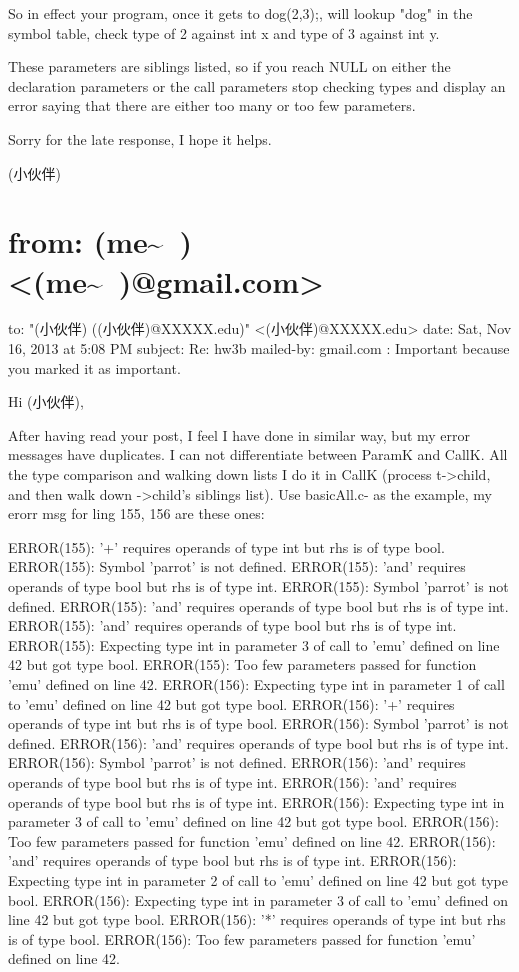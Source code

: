\documentclass[12pt]{book}
\begin{document}
So in effect your program, once it gets to dog(2,3);, will lookup "dog" in the symbol table, check type of 2 against int x and type of 3 against int y.

These parameters are siblings listed, so if you reach NULL on either the declaration parameters or the call parameters stop checking types and display an error saying that there are either too many or too few parameters.

Sorry for the late response, I hope it helps.

(小伙伴)

\section{from:         (me\textasciitilde{}~) <(me\textasciitilde{}~)@gmail.com>}
\label{sec-38-3}
to:         "(小伙伴) ((小伙伴)@XXXXX.edu)" <(小伙伴)@XXXXX.edu>
date:         Sat, Nov 16, 2013 at 5:08 PM
subject:         Re: hw3b
mailed-by:         gmail.com
:         Important because you marked it as important.

Hi (小伙伴), 

After having read your post, I feel I have done in similar way, but my error messages have duplicates. I can not differentiate between ParamK and CallK. All the type comparison and walking down lists I do it in CallK (process t->child\footnotemark[2]{}, and then walk down ->child\footnotemark[2]{}'s siblings list). Use basicAll.c- as the example, my erorr msg for ling 155, 156 are these ones: 

ERROR(155): '+' requires operands of type int but rhs is of type bool.
ERROR(155): Symbol 'parrot' is not defined.
ERROR(155): 'and' requires operands of type bool but rhs is of type int.
ERROR(155): Symbol 'parrot' is not defined.
ERROR(155): 'and' requires operands of type bool but rhs is of type int.
ERROR(155): 'and' requires operands of type bool but rhs is of type int.
ERROR(155): Expecting type int in parameter 3 of call to 'emu' defined on line 42 but got type bool.
ERROR(155): Too few parameters passed for function 'emu' defined on line 42.
ERROR(156): Expecting type int in parameter 1 of call to 'emu' defined on line 42 but got type bool.
ERROR(156): '+' requires operands of type int but rhs is of type bool.
ERROR(156): Symbol 'parrot' is not defined.
ERROR(156): 'and' requires operands of type bool but rhs is of type int.
ERROR(156): Symbol 'parrot' is not defined.
ERROR(156): 'and' requires operands of type bool but rhs is of type int.
ERROR(156): 'and' requires operands of type bool but rhs is of type int.
ERROR(156): Expecting type int in parameter 3 of call to 'emu' defined on line 42 but got type bool.
ERROR(156): Too few parameters passed for function 'emu' defined on line 42.
ERROR(156): 'and' requires operands of type bool but rhs is of type int.
ERROR(156): Expecting type int in parameter 2 of call to 'emu' defined on line 42 but got type bool.
ERROR(156): Expecting type int in parameter 3 of call to 'emu' defined on line 42 but got type bool.
ERROR(156): '*' requires operands of type int but rhs is of type bool.
ERROR(156): Too few parameters passed for function 'emu' defined on line 42.
\end{document}
